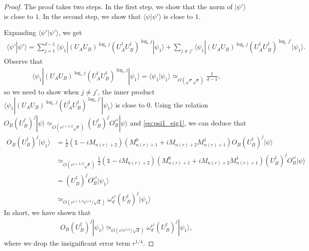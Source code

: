 \documentclass[11pt,letterpaper]{article}
\newcommand{\ket}[1]{|#1\rangle}
\newcommand{\bra}[1]{\langle#1|}
\newcommand{\braket}[2]{\langle#1|#2\rangle}
\newcommand{\ct}{^{\dagger}}
\DeclarePairedDelimiter{\norm}{\lVert}{\rVert}
\newcommand{\1}{\mathbb{1}}
\newcommand{\nr}{n(r)}
\newcommand{\se}{\sqrt{\epsilon}}
\newcommand{\qe}{\epsilon^{1/4}}
\newcommand{\sd}{\sqrt{d}}
\newcommand{\sr}{\sqrt{r}}
\newcommand{\appd}[1]{\simeq_{#1}}
\theoremstyle{definition}
\begin{document}
\begin{proof}
	The proof takes two steps. In the first step, 
	we show that the norm of $\ket{\psi'}$ is close to $1$.
	In the second step, 
	we show that $\braket{\psi}{\psi'}$ is close to $1$.
	
	Expanding $\braket{\psi'}{\psi'}$, we get
	\begin{align*}
	    \braket{\psi'}{\psi'} 
	    = \sum_{j=1}^{d-1} \bra{\psi_1} (U_AU_B)^{\log_r j} (U_A\ct U_B\ct)^{\log_r j}  \ket{\psi_1}
	    + \sum_{j\neq j'} \bra{\psi_1} (U_AU_B)^{\log_r j} (U_A\ct U_B\ct)^{\log_r j'}  \ket{\psi_1}.
	\end{align*}
	Observe that 
	\begin{align*}
		\bra{\psi_1} (U_AU_B)^{\log_r j} (U_A\ct U_B\ct)^{\log_r j}  \ket{\psi_1} =
		\braket{\psi_1}{\psi_1} \appd{O(\sr\se)} \frac{1}{d-1},
	\end{align*}
	so we need to show when $j \neq j'$, the inner product 
	$\bra{\psi_1} (U_AU_B)^{\log_r j} (U_A\ct U_B\ct)^{\log_r j'}  \ket{\psi_1}$
	is close to $0$.
	Using the relation $O_B(U_B\ct)^j \ket{\psi} \appd{O(r^{j+1/2} \se)} (U_B\ct)^j O_B^{r^j}\ket{\psi}$ and \cref{eq:psi1_eig1}, we can deduce that 
	\begin{align*}
	    O_B (U_B\ct)^j \ket{\psi_1} &= \frac{1}{2} (\1 - iM_{\nr+2})(M_{\nr+1}^0 + i M_{\nr+2}M_{\nr+1}^1)  O_B (U_B\ct)^j \ket{\psi}\\
	   & \appd{O(r^{j+1/2} \se)} \frac{1}{2} (\1 - iM_{\nr+2})(M_{\nr+1}^0 + i M_{\nr+2}M_{\nr+1}^1) (U_B\ct)^j 
	   O_B^{r^j} \ket{\psi} \\
	   & = (U_B\ct)^j O_B^{r^j} \ket{\psi_1} \\
	   & \appd{O(r^{j+1/4} \qe/ \sd)} \omega_d^{r^j} (U_B\ct)^j\ket{\psi_1}
	\end{align*}
	In short, we have shown that 
    \begin{align}
        \label{eq:B_omega}
        O_B (U_B\ct)^j \ket{\psi_1} \appd{O(r^{j} \qe/ \sd )} \omega_d^{r^j}  (U_B\ct)^j \ket{\psi_1},
    \end{align}
    where we drop the insignificant error term $r^{1/4}$.

\end{proof}
\end{document}
